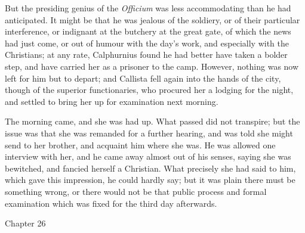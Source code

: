 But the presiding genius of the \emph{Officium} was less
accommodating than he had anticipated. It might be that he was jealous
of the soldiery, or of their particular interference, or indignant at
the butchery at the great gate, of which the news had just come, or
out of humour with the day's work, and especially with the Christians;
at any rate, Calphurnius found he had better have taken a bolder step,
and have carried her as a prisoner to the camp. However, nothing was
now left for him but to depart; and Callista fell again into the hands
of the city, though of the superior functionaries, who procured her a
lodging for the night, and settled to bring her up for examination
next morning.

The morning came, and she was had up. What passed did not
transpire; but the issue was that she was remanded for a further
hearing, and was told she might send to her brother, and acquaint him
where she was. He was allowed one interview with her, and he came away
almost out of his senses, saying she was bewitched, and fancied
herself a Christian. What precisely she had said to him, which gave
this impression, he could hardly say; but it was plain there must be
something wrong, or there would not be that public process and formal
examination which was fixed for the third day afterwards.

Chapter 26


